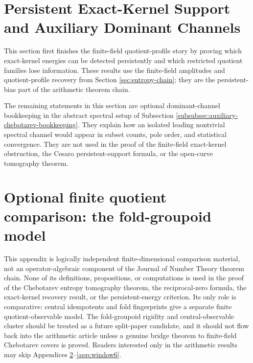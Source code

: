 \documentclass[12pt,a4paper]{article}
\theoremstyle{plain}
\theoremstyle{definition}
\numberwithin{equation}{section}
\begin{document}
\section{Persistent Exact-Kernel Support and Auxiliary Dominant Channels}\label{sec:artin-pole}
This section first finishes the finite-field quotient-profile story by proving which exact-kernel energies can be detected persistently and which restricted quotient families lose information.  These results use the finite-field amplitudes and quotient-profile recovery from Section \ref{sec:entropy-chain}; they are the persistent-bias part of the arithmetic theorem chain.



The remaining statements in this section are optional dominant-channel bookkeeping in the abstract spectral setup of Subsection \ref{subsubsec:auxiliary-chebotarev-bookkeeping}.  They explain how an isolated leading nontrivial spectral channel would appear in subset counts, pole order, and statistical convergence.  They are not used in the proof of the finite-field exact-kernel obstruction, the Cesaro persistent-support formula, or the open-curve tomography theorem.





\appendix

\section{Optional finite quotient comparison: the fold-groupoid model}\label{sec:groupoid-rigidity}
This appendix is logically independent finite-dimensional comparison material, not an operator-algebraic component of the Journal of Number Theory theorem chain.  None of its definitions, propositions, or computations is used in the proof of the Chebotarev entropy tomography theorem, the reciprocal-zero formula, the exact-kernel recovery result, or the persistent-energy criterion.  Its only role is comparative: central idempotents and fold fingerprints give a separate finite quotient-observable model.  The fold-groupoid rigidity and central-observable cluster should be treated as a future split-paper candidate, and it should not flow back into the arithmetic article unless a genuine bridge theorem to finite-field Chebotarev covers is proved.  Readers interested only in the arithmetic results may skip Appendices \ref{sec:groupoid-rigidity}--\ref{app:window6}.
\end{document}
